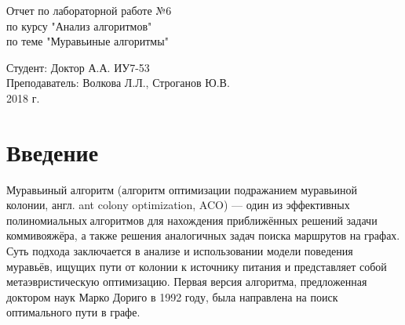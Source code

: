 \documentclass[a4paper, 14pt]{article}
\begin{document}
	\begin{titlepage}
		\begin{center}
			\begin{LARGE}
				Отчет по лабораторной работе №6\\
					по курсу "Анализ алгоритмов"\\
					по теме "Муравьиные алгоритмы"
			\end{LARGE}
		
			\begin{Large}
				\vspace{10cm}
				Студент: Доктор А.А. ИУ7-53\\
					Преподаватель: Волкова Л.Л.,
								   Строганов Ю.В.\\
				
				\vspace{5cm}2018 г.				   
			\end{Large}
			
		\end{center}
		 
	\end{titlepage}

\tableofcontents
	
\newpage
\section*{Введение}
\hspace{1cm}

Муравьиный алгоритм (алгоритм оптимизации подражанием муравьиной колонии, англ. ant colony optimization, ACO) — один из эффективных полиномиальных алгоритмов для нахождения приближённых решений задачи коммивояжёра, а также решения аналогичных задач поиска маршрутов на графах. Суть подхода заключается в анализе и использовании модели поведения муравьёв, ищущих пути от колонии к источнику питания и представляет собой метаэвристическую оптимизацию. Первая версия алгоритма, предложенная доктором наук Марко Дориго в 1992 году, была направлена на поиск оптимального пути в графе\cite{ant_description}.
\end{document}
